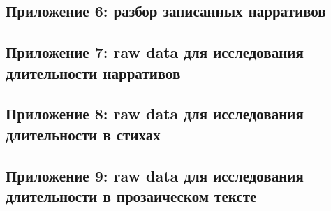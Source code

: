 \subsection{Приложение 6: разбор записанных нарративов} \label{corpus}

\pagebreak
\subsection{Приложение 7: raw data для исследования длительности нарративов} \label{corpus.raw}
\pagebreak
\subsection{Приложение 8: raw data для исследования длительности в стихах} \label{verse.raw}

\subsection{Приложение 9: raw data для исследования длительности в прозаическом тексте} \label{prose.raw}


